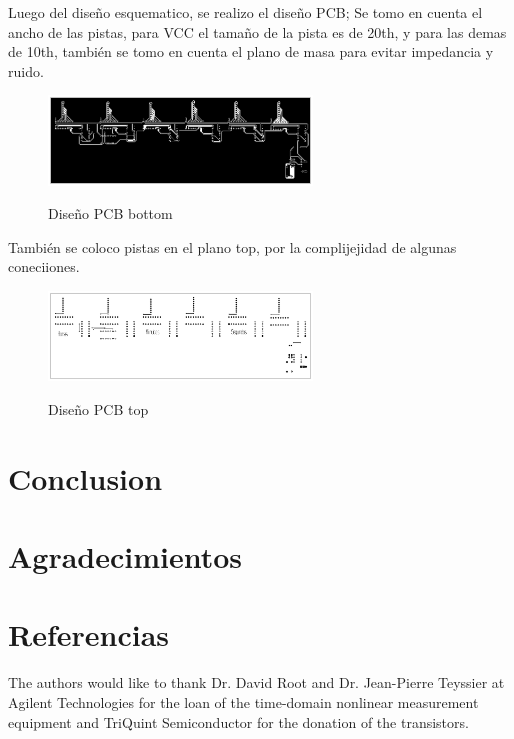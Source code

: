 \documentclass[journal]{IEEEtran}
\begin{document}
Luego del diseño esquematico, se realizo el diseño PCB; Se tomo en cuenta el ancho de las pistas, para VCC el tamaño de la pista es de 20th, y para las demas de 10th, también se tomo en cuenta el plano de masa para evitar impedancia y ruido.
\begin{figure}[h]
    \centering
    \includegraphics[width=7cm]{pdf/RD_b.pdf}\\
    \caption{Diseño PCB bottom}
    \label{PCB_B}
\end{figure} 
También se coloco pistas en el plano top, por la complijejidad de algunas coneciiones.
\begin{figure}[h]
    \centering
    \includegraphics[width=7cm]{pdf/RD_t.pdf}\\
    \caption{Diseño PCB top}
    \label{PCB_T}
\end{figure}
\section{Conclusion}


\section*{Agradecimientos}
\section*{Referencias}


The authors would like to thank Dr. David Root and Dr. Jean-Pierre Teyssier at Agilent Technologies for the loan of the time-domain nonlinear measurement equipment and TriQuint Semiconductor for the donation of the transistors. 



\end{document}
